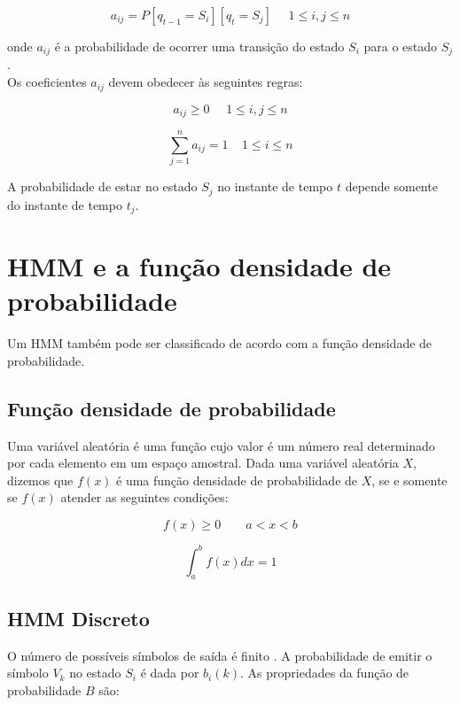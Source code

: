  \begin{equation}
 a_{ij} =  P [q_{t-1} = S_i] [q_t = S_j]~~\textrm{ }~ 1 \leq i, j\leq n
\end{equation}

onde $a_{ij}$ é a probabilidade de ocorrer uma transição do estado $S_i$ para o estado $S_j$.\\
Os coeficientes $a_{ij}$ devem obedecer às seguintes regras:

\begin{equation}
a_{ij} \geq 0~~\textrm{ }~ 1 \leq i,j \leq n 
\end{equation}

\begin{equation}
\displaystyle \sum_{j=1}^n a_{ij} = 1~\textrm{ }~ 1 \leq i \leq n 
\end{equation}

A probabilidade de estar no estado $S_j$ no instante de tempo $t$ depende somente do instante de tempo $t_j$.\\


\section{HMM e a função densidade de probabilidade}

\quad Um HMM também pode ser classificado de acordo com a função densidade de probabilidade. 

\subsection{Função densidade de probabilidade}
\quad Uma variável aleatória é uma função cujo valor é um número real determinado por cada elemento em um espaço amostral. Dada uma variável aleatória $X$, dizemos que $f(x)$ é uma função densidade de probabilidade de $X$, se e somente se $f(x)$ atender as seguintes condições:

$$
\displaystyle f(x) \geq 0  \qquad a < x < b
$$


\begin{equation}
 \int_a^b f(x)dx = 1 
\end{equation}


\subsection{HMM Discreto}
\quad O número de possíveis símbolos de saída é finito \cite{fundRecFala}.
 A probabilidade de emitir o símbolo $V_k$ no estado $S_i$ é dada por $b_i(k)$. As propriedades da função de probabilidade $B$ são:

